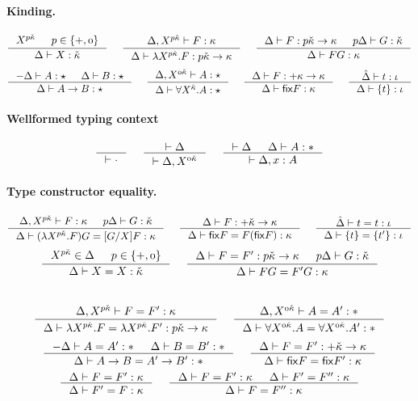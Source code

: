 \paragraph{Kinding.}
\[ \inference{X^{p\ka} & p\in\{+,\oldstylenums{0}\}}{\Delta |- X : \ka}
 ~~~~
   \inference{\Delta,X^{p\ka} |- F : \kappa}
             {\Delta |- \lambda X^{p\ka}.F : p\ka\to\kappa}
 ~~~~
   \inference{\Delta |- F : p\ka\to\kappa & p\Delta |- G : \ka}
             {\Delta |- F G : \kappa}
\]
\[ \inference{-\Delta |- A : \star & \Delta |- B : \star}
             {\Delta |- A \to B : \star }
 ~~~~
   \inference{\Delta, X^{\oz\ka} |- A : \star}
             {\Delta |- \forall X^\ka . A : \star}
 ~~~~
   \inference{\Delta |- F : +\kappa \to \kappa}{\Delta |- \fix F : \kappa}
 ~~~~
   \inference{\hat\Delta |- t : \iota}{\Delta |- \{t\} : \iota}
\]

\paragraph{Wellformed typing context}
\[ \inference{}{|-\cdot}
 ~~~~
   \inference{|-\Delta}{|-\Delta,X^{\oz\ka}}
 ~~~~
   \inference{|-\Delta & \Delta |- A:*}{|-\Delta,x:A}
\]

\paragraph{Type constructor equality.}
\[ \inference{\Delta,X^{p\ka} |- F:\kappa & p\Delta |- G:\ka}
             {\Delta |- (\lambda X^{p\ka}.F) G = [G/X]F:\kappa}
 ~~~~
   \inference{\Delta |- F : +\ka\to\kappa}
             {\Delta |- \fix F = F(\fix F) : \kappa}
 ~~~~
   \inference{\hat\Delta |- t=t : \iota}{\Delta |- \{t\}=\{t'\}:\iota}
\]
\[ \inference{X^{p\ka}\in\Delta & p\in\{+,\oz\}}{\Delta |- X=X:\ka}
 ~~~~
   \inference{\Delta |- F=F':p\ka\to\kappa & p\Delta |- G:\ka}
             {\Delta |- F G = F' G : \kappa}
\]
 ~~~~
\[ \inference{\Delta,X^{p\ka} |- F=F' : \kappa}
             {\Delta |- \lambda X^{p\ka}.F=\lambda X^{p\ka}.F' : p\ka\to\kappa}
 ~~~~
   \inference{\Delta,X^{\oz\ka} |- A=A':*}
             {\Delta |- \forall X^{\oz\ka}.A=\forall X^{\oz\ka}.A':*}
\]
\[ \inference{-\Delta |- A=A':* & \Delta |- B=B':*}{\Delta |- A\to B=A'\to B':*}
 ~~~~
   \inference{\Delta |- F=F':+\ka\to\kappa}{\Delta |- \fix F=\fix F':\kappa}
\]
\[ \inference{\Delta |- F = F' : \kappa}{\Delta |- F' = F : \kappa}
 ~~~~
   \inference{\Delta |- F = F' : \kappa & \Delta |- F' = F'' : \kappa}
             {\Delta |- F = F'' : \kappa}
\]

